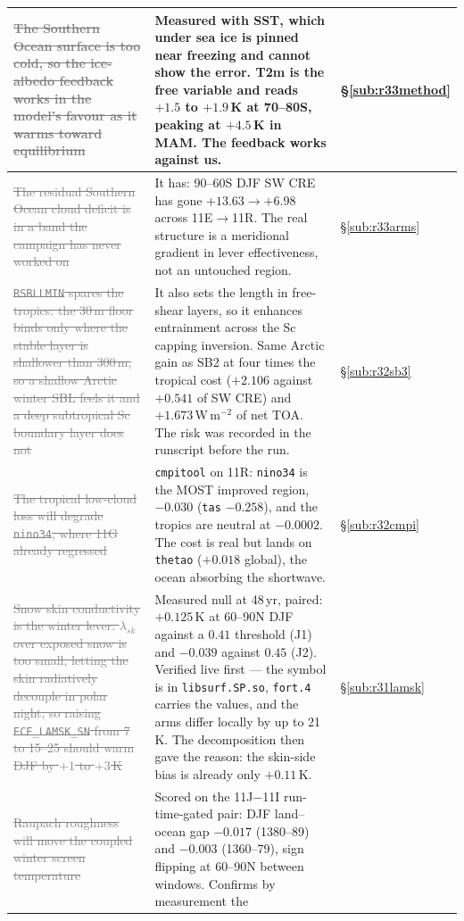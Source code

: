 \documentclass[10pt]{article}
\newcommand{\dead}[1]{\textcolor{gray}{\sout{#1}}}
\begin{document}
\begin{center}
\begin{tabular}{p{} p{} l}
\dead{The Southern Ocean surface is too cold, so the ice-albedo feedback works in the
model's favour as it warms toward equilibrium} &
Measured with SST, which under sea ice is pinned near freezing and cannot show the
error. T2m is the free variable and reads $+1.5$ to $+1.9$\,K at 70--80S, peaking at
$+4.5$\,K in MAM. The feedback works against us. &
\S\ref{sub:r33method} \\
\midrule
\dead{The residual Southern Ocean cloud deficit is in a band the campaign has never
worked on} &
It has: 90--60S DJF SW CRE has gone $+13.63\to+6.98$ across 11E$\to$11R. The real
structure is a meridional gradient in lever effectiveness, not an untouched region. &
\S\ref{sub:r33arms} \\
\midrule
\dead{\texttt{RSBLLMIN} spares the tropics: the 30\,m floor binds only where the stable
layer is shallower than 300\,m, so a shallow Arctic winter SBL feels it and a deep
subtropical Sc boundary layer does not} &
It also sets the length in free-shear layers, so it enhances entrainment across the Sc
capping inversion. Same Arctic gain as SB2 at four times the tropical cost
($+2.106$ against $+0.541$ of SW CRE) and $+1.673$\,W\,m$^{-2}$ of net TOA. The risk was
recorded in the runscript before the run. &
\S\ref{sub:r32sb3} \\
\midrule
\dead{The tropical low-cloud loss will degrade \texttt{nino34}, where 11G already
regressed} &
\texttt{cmpitool} on 11R: \texttt{nino34} is the MOST improved region, $-0.030$
(\texttt{tas} $-0.258$), and the tropics are neutral at $-0.0002$. The cost is real but
lands on \texttt{thetao} ($+0.018$ global), the ocean absorbing the shortwave. &
\S\ref{sub:r32cmpi} \\
\midrule
\dead{Snow skin conductivity is the winter lever: $\lambda_{sk}$ over exposed snow is
too small, letting the skin radiatively decouple in polar night, so raising
\texttt{ECE\_LAMSK\_SN} from 7 to 15--25 should warm DJF by $+1$ to $+3$\,K} &
Measured null at 48\,yr, paired: $+0.125$\,K at 60--90N DJF against a $0.41$ threshold
(J1) and $-0.039$ against $0.45$ (J2). Verified live first --- the symbol is in
\texttt{libsurf.SP.so}, \texttt{fort.4} carries the values, and the arms differ locally by
up to 21\,K. The decomposition then gave the reason: the skin-side bias is already only
$+0.11$\,K. &
\S\ref{sub:r31lamsk} \\
\midrule
\dead{Raupach roughness will move the coupled winter screen temperature} &
Scored on the 11J$-$11I run-time-gated pair: DJF land--ocean gap $-0.017$ (1380--89) and
$-0.003$ (1360--79), sign flipping at 60--90N between windows. Confirms by measurement the

\end{tabular}
\end{center}
\end{document}
